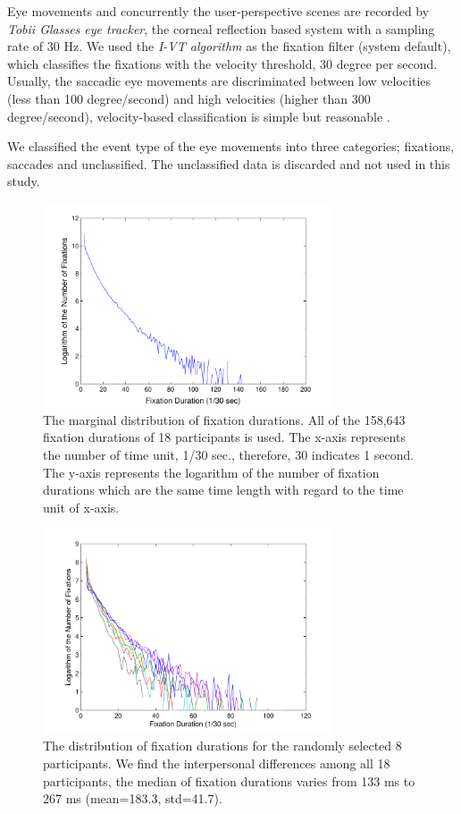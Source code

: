 \documentclass[10pt,letterpaper]{article}
\begin{document}
Eye movements and concurrently the user-perspective scenes are recorded by \textit{Tobii Glasses eye tracker}, the corneal reflection based system with a sampling rate of 30 Hz. We used the \textit{I-VT algorithm} as the fixation filter (system default), which classifies the fixations with the velocity threshold, 30 degree per second. Usually, the saccadic eye movements are discriminated between low velocities (less than 100 degree/second) and high velocities (higher than 300 degree/second), velocity-based classification is simple but reasonable \cite{Salvucci2000}.

We classified the event type of the eye movements into three categories; fixations, saccades and unclassified. The unclassified data is discarded and not used in this study.

\begin{figure}
  \centerline{\includegraphics[width=86mm,trim=10mm 3mm 10mm 3mm]{./eps/marginal_fixation_duration.pdf}}
  \caption{The marginal distribution of fixation durations. All of the 158,643 fixation durations of 18 participants is used. The x-axis represents the number of time unit, 1/30 sec., therefore, 30 indicates 1 second. The y-axis represents the logarithm of the number of fixation durations which are the same time length with regard to the time unit of x-axis.}
  \label{fig:marginal-fixation-duration}
\end{figure}

\begin{figure}
  \centerline{\includegraphics[width=86mm,trim=10mm 3mm 10mm 3mm]{./eps/individual_fixation_duration.pdf}}
  \caption{The distribution of fixation durations for the randomly selected 8 participants. We find the interpersonal differences among all 18 participants, the median of fixation durations varies from 133 ms to 267 ms (mean=183.3, std=41.7).}
  \label{fig:individual-fixation-duration}
\end{figure}
\end{document}
